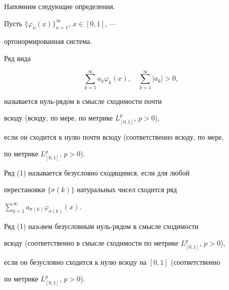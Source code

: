\maketitle


\label{begin}








Напомним следующие определения.


Пусть $\{ \varphi_n(x)\}_{n=1}^\infty$, $x\in [0,1]$, ---


ортонормированная система.





\begin{defn}


Ряд вида


\begin{equation}


\sum_{k=1}^\infty a_k \varphi_k(x),\quad \sum_{k=1}^\infty |a_k|>0,


\end{equation}


называется нуль-рядом в смысле сходимости почти 


всюду (всюду, по мере, по метрике $L^p_{[0,1]}$, $p>0$), 


если он сходится к нулю почти всюду (соответственно всюду, по мере, 


по метрике $L^p_{[0,1]}$, $p>0$). 


\end{defn}





\begin{defn}


Ряд (1) называется безусловно сходящимся, если для любой 


перестановки $\{\sigma(k)\}$ натуральных чисел сходится ряд


$\sum\limits_{k=1}^\infty a_{\sigma(k)} \varphi_{\sigma(k)}(x)$.


\end{defn}





\begin{defn}


Ряд (1) назoвем безусловным нуль-рядом в смысле сходимости 


всюду (соответственно в смысле сходимости по метрике $L^p_{[0,1]}$, $p>0$), 


если он безусловно сходится к нулю всюду на $[0,1]$ (соответственно


по метрике $L^p_{[0,1]}$, $p>0$). 


\end{defn}





